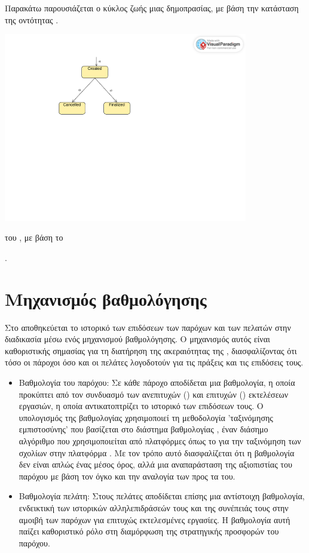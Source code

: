 Παρακάτω παρουσιάζεται ο κύκλος ζωής μιας δημοπρασίας, με βάση την κατάσταση  της οντότητας .
\begin{illustration}
    \centering
    \includegraphics[width=0.8\textwidth]{figures/figure-006.pdf}
    \caption{ του , με βάση το } 
    \begin{minipage}{\textwidth}
        \centering
        \small
        .
      \end{minipage}
\end{illustration}

\newpage

\section{Μηχανισμός βαθμολόγησης}
Στο   αποθηκεύεται το ιστορικό των επιδόσεων των παρόχων και των πελατών στην διαδικασία μέσω ενός μηχανισμού βαθμολόγησης. Ο μηχανισμός αυτός είναι καθοριστικής σημασίας για τη διατήρηση της ακεραιότητας της , διασφαλίζοντας ότι τόσο οι πάροχοι όσο και οι πελάτες λογοδοτούν για τις πράξεις και τις επιδόσεις τους.
\begin{itemize}
    \item Βαθμολογία του παρόχου: Σε κάθε πάροχο αποδίδεται μια βαθμολογία, η οποία προκύπτει από τον συνδυασμό των ανεπιτυχών () και επιτυχών () εκτελέσεων εργασιών, η οποία αντικατοπτρίζει το ιστορικό των επιδόσεων τους. Ο υπολογισμός της βαθμολογίας χρησιμοποιεί τη μεθοδολογία 'ταξινόμησης εμπιστοσύνης' που βασίζεται στο διάστημα βαθμολογίας , έναν διάσημο αλγόριθμο που χρησιμοποιείται από πλατφόρμες όπως το  για την ταξινόμηση των σχολίων στην πλατφόρμα \cite{ref49}. Με τον τρόπο αυτό διασφαλίζεται ότι η βαθμολογία δεν είναι απλώς ένας μέσος όρος, αλλά μια αναπαράσταση της αξιοπιστίας του παρόχου με βάση τον όγκο και την αναλογία των  προς τα  του. 
    \item Βαθμολογία πελάτη: Στους πελάτες αποδίδεται επίσης μια αντίστοιχη βαθμολογία, ενδεικτική των ιστορικών αλληλεπιδράσεών τους και της συνέπειάς τους στην αμοιβή των παρόχων για επιτυχώς εκτελεσμένες εργασίες. Η βαθμολογία αυτή παίζει καθοριστικό ρόλο στη διαμόρφωση της στρατηγικής προσφορών του παρόχου.
\end{itemize}

